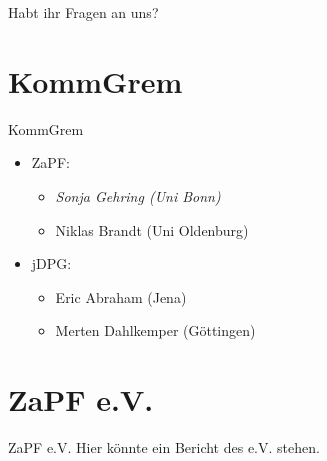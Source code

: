 \documentclass[compress, aspectratio=169]{beamer}
\begin{document}
\begin{frame}[plain]
  \begin{center}
    \Huge Habt ihr Fragen an uns?
    \end{center}
\end{frame}

\section{KommGrem}

\begin{frame}{KommGrem}
  \begin{itemize}
  \item[] ZaPF:
    \begin{itemize}
    \item \emph{Sonja Gehring (Uni Bonn)}
    \item Niklas Brandt (Uni Oldenburg)
    \end{itemize}
  \item[] jDPG:
    \begin{itemize}
    \item Eric Abraham (Jena)
    \item Merten Dahlkemper (Göttingen)
    \end{itemize}
  \end{itemize}
  \vspace{0.5cm}
\end{frame}


\section{ZaPF e.V.}

\begin{frame}{ZaPF e.V.}
Hier könnte ein Bericht des e.V. stehen.
\end{frame} 
\end{document}
